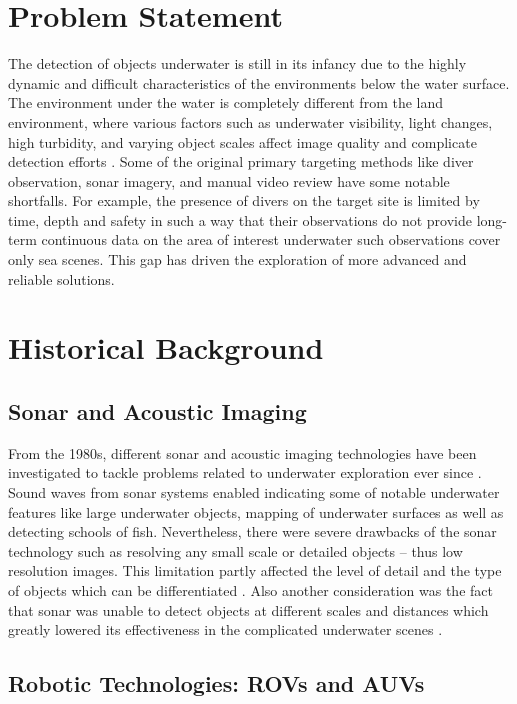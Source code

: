 \section{Problem Statement}

The detection of objects underwater is still in its infancy due to the highly dynamic and difficult characteristics of the environments below the water surface. The environment under the water is completely different from the  land environment, where various factors such as underwater visibility, light changes, high turbidity, and varying object scales affect image quality and complicate detection efforts \cite{ancuti2018color,jmse12091606}. Some of the original primary targeting methods like diver observation, sonar imagery, and manual video review have some notable shortfalls. For example, the presence of divers on the target site is limited by time, depth and safety in such a way that their observations do not provide long-term continuous data on the area of interest underwater such observations cover only sea scenes. This gap has driven the exploration of more advanced and reliable solutions. \cite{jmse12091606}
\section{Historical Background}

\subsection{Sonar and Acoustic Imaging}

From the 1980s, different sonar and acoustic imaging technologies have been investigated to tackle problems related to underwater exploration ever since \cite{rajapan2022acoustic}. Sound waves from sonar systems enabled indicating some of notable underwater features like large underwater objects, mapping of underwater surfaces as well as detecting schools of fish. Nevertheless, there were severe drawbacks of the sonar technology such as resolving any small scale or detailed objects – thus low resolution images. This limitation partly affected the level of detail and the type of objects which can be differentiated \cite{kraken_sonar, asp_sonar_resolution}. Also another consideration was the fact that sonar was unable to detect objects at different scales and distances which greatly lowered its effectiveness in the complicated underwater scenes \cite{mdpi_sonar_impact}.

\subsection{Robotic Technologies: ROVs and AUVs}

